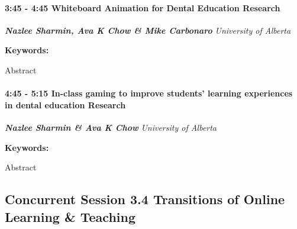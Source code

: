 \documentclass[
]{book}
\begin{document}
\begin{session}
\hypertarget{whiteboard-animation-for-dental-education-research}{%
\paragraph*{\texorpdfstring{3:45 - 4:45 \textbar{} \textbf{Whiteboard
Animation for Dental Education} \textbar{}
Research}{3:45 - 4:45 \textbar{} Whiteboard Animation for Dental Education \textbar{} Research}}\label{whiteboard-animation-for-dental-education-research}}

\textbf{\emph{Nazlee Sharmin, Ava K Chow \& Mike Carbonaro}} \textbar{}
\emph{University of Alberta}

\textbf{Keywords:}

Abstract
\end{session}

\begin{session}
\hypertarget{in-class-gaming-to-improve-students-learning-experiences-in-dental-education-research}{%
\paragraph*{\texorpdfstring{4:45 - 5:15 \textbar{} \textbf{In-class
gaming to improve students' learning experiences in dental education}
\textbar{}
Research}{4:45 - 5:15 \textbar{} In-class gaming to improve students' learning experiences in dental education \textbar{} Research}}\label{in-class-gaming-to-improve-students-learning-experiences-in-dental-education-research}}

\textbf{\emph{Nazlee Sharmin \& Ava K Chow}} \textbar{} \emph{University
of Alberta}

\textbf{Keywords:}

Abstract
\end{session}

\hypertarget{concurrent-session-3.4-transitions-of-online-learning-teaching}{%
\subsection*{Concurrent Session 3.4 \textbar{} Transitions of Online Learning \& Teaching}\label{concurrent-session-3.4-transitions-of-online-learning-teaching}}
\end{document}
